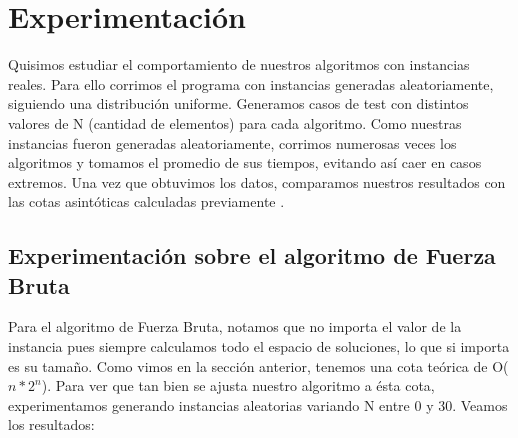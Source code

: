 \section{Experimentación}

Quisimos estudiar el comportamiento de nuestros algoritmos con instancias reales. Para ello corrimos el programa con instancias generadas aleatoriamente, siguiendo una distribución uniforme. Generamos casos de test con distintos valores de N (cantidad de elementos) para cada algoritmo. Como nuestras instancias fueron generadas aleatoriamente, corrimos numerosas veces los algoritmos y tomamos el promedio de sus tiempos, evitando así caer en casos extremos.
Una vez que obtuvimos los datos, comparamos nuestros resultados con las cotas asintóticas calculadas previamente .


\subsection{Experimentación sobre el algoritmo de Fuerza Bruta}
Para el algoritmo de Fuerza Bruta, notamos que no importa el valor de la instancia pues siempre calculamos todo el espacio de soluciones, lo que si importa es su tamaño. Como vimos en la sección anterior, tenemos una cota teórica de O($n*2^{n}$). Para ver que tan bien se ajusta nuestro algoritmo a ésta cota, experimentamos generando instancias aleatorias variando N entre 0 y 30. Veamos los resultados:


